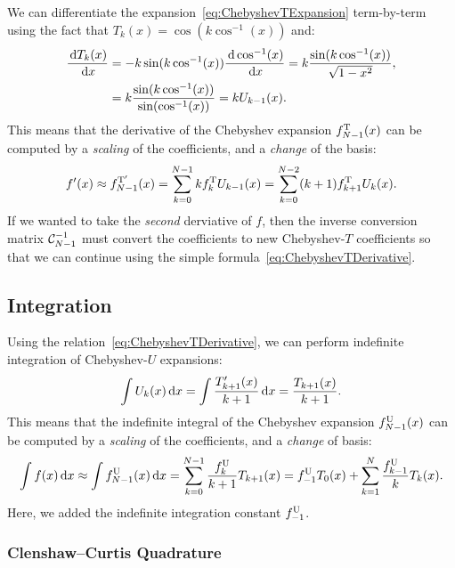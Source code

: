 We can differentiate the expansion~\eqref{eq:ChebyshevTExpansion} term-by-term using the fact that $T_k(x) = \cos(k\cos^{-1}(x))$ and:
\begin{align}
\dfrac{{\rm\,d} T_k(x)}{{\rm\,d} x} & = -k\sin(k\cos^{-1}(x)) \dfrac{{\rm\,d} \cos^{-1}(x)}{{\rm\,d} x} = k\dfrac{\sin(k\cos^{-1}(x))}{\sqrt{1-x^2}},\nonumber\\
& = k\dfrac{\sin(k\cos^{-1}(x))}{\sin(\cos^{-1}(x))} = kU_{k-1}(x).\label{eq:ChebyshevTDerivative}
\end{align}
This means that the derivative of the Chebyshev expansion $f_{N-1}^{\rm T}(x)$ can be computed by a {\em scaling} of the coefficients, and a {\em change} of the basis:
\begin{equation}
f'(x) \approx f_{N-1}^{\rm T'}(x) = \sum_{k=0}^{N-1} kf_k^{\rm T} U_{k-1}(x) = \sum_{k=0}^{N-2} (k+1)f_{k+1}^{\rm T}U_k(x).
\end{equation}
If we wanted to take the {\em second} derviative of $f$, then the inverse conversion matrix $\mathcal{C}_{N-1}^{-1}$ must convert the coefficients to new Chebyshev-$T$ coefficients so that we can continue using the simple formula~\eqref{eq:ChebyshevTDerivative}.

\subsection{Integration}

Using the relation~\eqref{eq:ChebyshevTDerivative}, we can perform indefinite integration of Chebyshev-$U$ expansions:
\begin{equation}
\int U_k(x){\rm\,d} x = \int \dfrac{T_{k+1}'(x)}{k+1}{\rm\,d} x = \dfrac{T_{k+1}(x)}{k+1}.
\end{equation}
This means that the indefinite integral of the Chebyshev expansion $f_{N-1}^{\rm U}(x)$ can be computed by a {\em scaling} of the coefficients, and a {\em change} of basis:
\begin{equation}
\int f(x){\rm\,d} x \approx \int f_{N-1}^{\rm U}(x){\rm\,d} x = \sum_{k=0}^{N-1} \dfrac{f_k^{\rm U}}{k+1} T_{k+1}(x) =  f_{-1}^{\rm U}T_0(x) + \sum_{k=1}^{N} \dfrac{f_{k-1}^{\rm U}}{k} T_k(x).
\end{equation}
Here, we added the indefinite integration constant $f_{-1}^{\rm U}$.

\subsubsection{Clenshaw--Curtis Quadrature}

